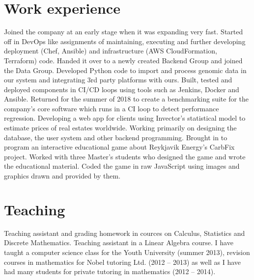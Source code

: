 \documentclass[11pt,a4paper,sans]{moderncv}
\begin{document}
\section{Work experience}
{Joined the company at an early stage when it was expanding very fast.
Started off in DevOps like assignments of maintaining, executing and
further developing deployment (Chef, Ansible) and infrastructure (AWS
CloudFormation, Terraform) code. Handed it over to a newly created Backend
Group and joined the Data Group. Developed Python code to import and process
genomic data in our system and integrating 3rd party platforms with ours.
Built, tested and deployed components in CI/CD loops using tools such as
Jenkins, Docker and Ansible. Returned for the summer of 2018 to create a
benchmarking suite for the company's core software which runs in a CI loop to
detect performance regression.}
{Developing a web app for clients using Invector's statistical model to estimate 
prices of real estates worldwide. Working primarily on designing the database, 
the user system and other backend programming.}
{Brought in to program an interactive educational game about Reykjavik Energy's
CarbFix project. Worked with three Master's students who designed the game and
wrote the educational material. Coded the game in raw JavaScript using images
and graphics drawn and provided by them.}

\section{Teaching}
{Teaching assistant and grading homework in cources on Calculus, Statistics
and Discrete Mathematics.}
{Teaching assistant in a Linear Algebra course.}
{I have taught a computer science class for the Youth University
(summer 2013), revision courses in mathematics for Nobel tutoring Ltd.
(2012 -- 2013) as well as I have had many students for private tutoring
in mathematics (2012 -- 2014).}
\end{document}
